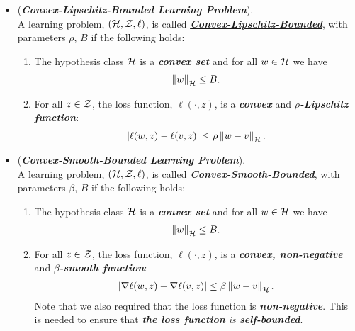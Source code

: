 \documentclass[11pt]{article}
\begin{document}
\begin{itemize}
\item \begin{definition}(\textbf{\emph{Convex-Lipschitz-Bounded Learning Problem}}). \\
A learning problem, $({\mathcal H}, {\mathcal Z}, \ell)$, is called \underline{\textbf{\emph{Convex-Lipschitz-Bounded}}}, with parameters $\rho$,  $B$ if the
following holds:
\begin{enumerate}
\item  The hypothesis class ${\mathcal H}$ is a \emph{\textbf{convex set}} and for all $w \in {\mathcal H}$ we have 
\begin{align*}
\left\|w\right\|_{{\mathcal H}} \le B.
\end{align*}
\item For all $z \in {\mathcal Z}$, the loss function, $\ell(\cdot, z)$, is a \textbf{\emph{convex}} and \emph{\textbf{$\rho$-Lipschitz function}}:
\begin{align*}
\left\lvert \ell(w, z) - \ell(v, z) \right\rvert \le \rho \left\|w  - v\right\|_{{\mathcal H}}.
\end{align*}
\end{enumerate}
\end{definition}

\item \begin{definition}(\textbf{\emph{Convex-Smooth-Bounded Learning Problem}}). \\
A learning problem, $({\mathcal H}, {\mathcal Z}, \ell)$, is called \underline{\textbf{\emph{Convex-Smooth-Bounded}}}, with parameters $\beta$,  $B$ if the
following holds:
\begin{enumerate}
\item  The hypothesis class ${\mathcal H}$ is a \emph{\textbf{convex set}} and for all $w \in {\mathcal H}$ we have 
\begin{align*}
\left\|w\right\|_{{\mathcal H}} \le B.
\end{align*}
\item For all $z \in {\mathcal Z}$, the loss function, $\ell(\cdot, z)$, is a \textbf{\emph{convex, non-negative}} and \emph{\textbf{$\beta$-smooth function}}:
\begin{align*}
\left\lvert \nabla \ell(w, z) - \nabla \ell(v, z) \right\rvert \le \beta \left\|w  - v\right\|_{{\mathcal H}}.
\end{align*} Note that we also required that the loss function is \emph{\textbf{non-negative}}. This is needed to ensure that \emph{\textbf{the loss function} is \textbf{self-bounded}}.
\end{enumerate}
\end{definition}
\end{itemize}
\end{document}

